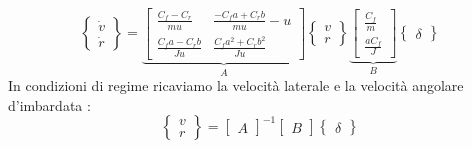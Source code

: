 \begin{equation}
\begin{Bmatrix}
\dot v\\
\dot r
\end{Bmatrix}
=
\underbrace{\begin{bmatrix}
\frac{ C_f - C_r}{mu} & \frac{- C_fa + C_rb}{mu} - u\\
\frac{ C_fa - C_rb}{Ju}  & \frac{C_f a^2 + C_r b^2}{Ju} 
\end{bmatrix}}_{A}
\begin{Bmatrix}
v\\
r
\end{Bmatrix}
\underbrace{\begin{bmatrix}
\frac{C_f}{m}\\
\frac{aC_f}{J} 
\end{bmatrix}}_{B}
\begin{Bmatrix}
\delta
\end{Bmatrix}
\end{equation}
In condizioni di regime ricaviamo la velocità laterale e la velocità angolare d'imbardata :
\begin{equation}
\begin{Bmatrix}
v\\
r
\end{Bmatrix}
=
\begin{bmatrix}
A 
\end{bmatrix}^{-1}
\begin{bmatrix}
B 
\end{bmatrix}
\begin{Bmatrix}
\delta
\end{Bmatrix}
\end{equation}

